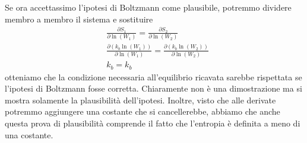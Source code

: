 \documentclass[
10pt, %
a4paper, %
oneside, %
headinclude,footinclude, %
BCOR5mm, %
]{scrartcl}
\begin{document}
Se ora accettassimo l'ipotesi di Boltzmann come plausibile, potremmo dividere membro a membro il sistema e sostituire
\begin{align*}
	&\frac{\partial S_1}{\partial \ln(W_1)} = \frac{\partial S_2}{\partial \ln(W_2)}\\
	&\frac{\partial (k_b \ln(W_1))}{\partial \ln(W_1)} = \frac{\partial (k_b \ln(W_2))}{\partial \ln(W_2)}\\
	&k_b = k_b
\end{align*}
otteniamo che la condizione necessaria all'equilibrio ricavata sarebbe rispettata se l'ipotesi di Boltzmann fosse corretta. Chiaramente non è una dimostrazione ma si mostra solamente la plausibilità dell'ipotesi. Inoltre, visto che alle derivate potremmo aggiungere una costante che si cancellerebbe, abbiamo che anche questa prova di plausibilità comprende il fatto che l'entropia è definita a meno di una costante.
\end{document}

